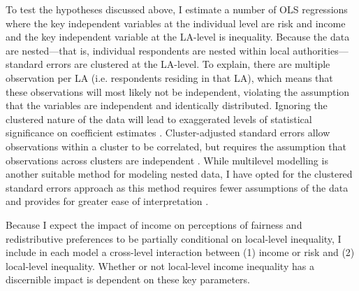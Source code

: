 \documentclass[12pt, letter]{scrartcl}
\begin{document}
To test the hypotheses discussed above, I estimate a number of OLS regressions where the key independent variables at the individual level are risk and income and the key independent variable at the LA-level is inequality. Because the data are nested---that is, individual respondents are nested within local authorities---standard errors are clustered at the LA-level. To explain, there are multiple observation per LA (i.e. respondents residing in that LA), which means that these observations will most likely not be independent, violating the assumption that the variables are independent and identically distributed. Ignoring the clustered nature of the data will lead to exaggerated levels of statistical significance on coefficient estimates \parencite{moulton1990illustration}. Cluster-adjusted standard errors allow observations within a cluster to be correlated, but requires the assumption that observations across clusters are independent \parencite{primo2007estimating}. While multilevel modelling is another suitable method for modeling nested data, I have opted for the clustered standard errors approach as this method requires fewer assumptions of the data and provides for greater ease of interpretation \parencite{steenbergen2002modeling}. 

Because I expect the impact of income on perceptions of fairness and redistributive preferences to be partially conditional on local-level inequality, I include in each model a cross-level interaction between (1) income or risk and (2) local-level inequality. Whether or not local-level income inequality has a discernible impact is dependent on these key parameters. 
\end{document}
